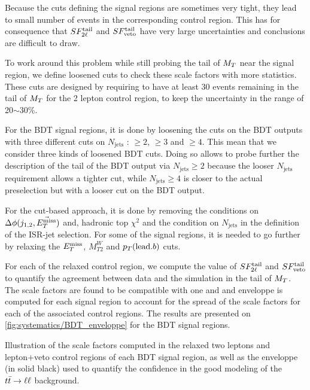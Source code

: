             Because the cuts defining the signal regions are sometimes very tight, they lead to
            small number of events in the corresponding control region. This has for consequence that
            $SF_{2\ell}^{\text{tail}}$ and $SF_{\text{veto}}^{\text{tail}}$ have very large uncertainties and conclusions are
            difficult to draw.

            To work around this problem while still probing the tail of $M_T$ near the signal
            region, we define loosened cuts to check these scale factors with more statistics.
            These cuts are designed by requiring to have at least 30 events remaining in the tail of
            $M_T$ for the 2 lepton control region, to keep the uncertainty in the range of 20$\sim$30\%.
            
            For the BDT signal regions, it is done by loosening the cuts on the BDT outputs with
            three different cuts on $N_\text{jets}$ : $\geq 2$, $\geq 3$ and $\geq 4$. This mean
            that we consider three kinds of loosened BDT cuts. Doing so allows to probe further the
            description of the tail of the BDT output via $N_\text{jets} \geq 2$ because the looser
            $N_\text{jets}$ requirement allows a tighter cut, while $N_\text{jets} \geq 4$ is closer
            to the actual preselection but with a looser cut on the BDT output. 

            For the cut-based approach, it is done by removing the conditions on $\Delta \phi( j_{1,2},
            \vec{E_T^\text{miss}} )$ and, hadronic top $\chi^2$ and the condition on $N_\text{jets}$ in the definition
            of the ISR-jet selection. For some of the signal regions, it is needed to go further by 
            relaxing the $E_T^\text{miss}$, $M_{T2}^W$ and $p_T(\text{lead.} b)$ cuts. 

            For each of the relaxed control region, we compute the value of $SF_{2\ell}^{\text{tail}}$ and
            $SF_{\text{veto}}^{\text{tail}}$ to quantify the agreement between data and the simulation in the tail of $M_T$.
            The scale factors are found to be compatible with one and and enveloppe is computed for
            each signal region to account for the spread of the scale factors for each of the
            associated control regions. The results are presented on \ref{fig:systematics/BDT_enveloppe} for
            the BDT signal regions.

                         {Illustration of the scale factors computed in the relaxed two 
                         leptons and lepton+veto control regions of each BDT signal region, 
                         as well as the enveloppe (in solid black) used to quantify the 
                         confidence in the good modeling of the $t\bar{t} \rightarrow \ell \ell$ background.}


